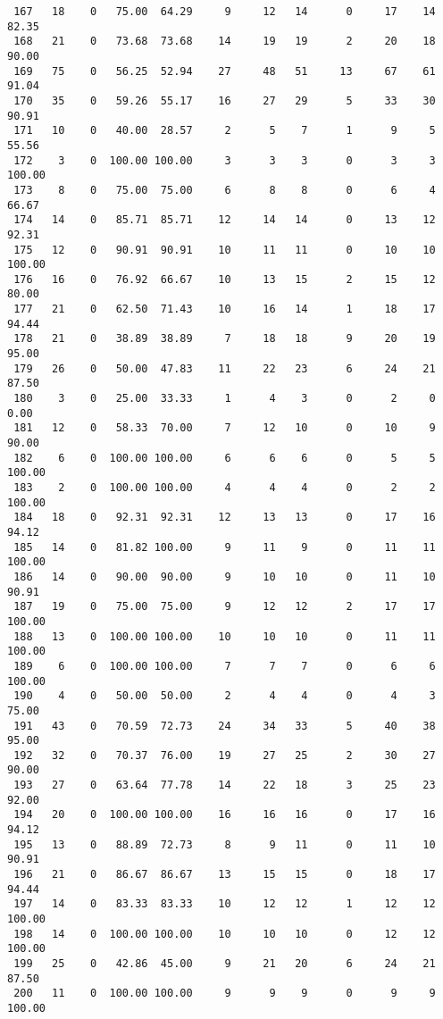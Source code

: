 \begin{verbatim}
 167   18    0   75.00  64.29     9     12   14      0     17    14    82.35
 168   21    0   73.68  73.68    14     19   19      2     20    18    90.00
 169   75    0   56.25  52.94    27     48   51     13     67    61    91.04
 170   35    0   59.26  55.17    16     27   29      5     33    30    90.91
 171   10    0   40.00  28.57     2      5    7      1      9     5    55.56
 172    3    0  100.00 100.00     3      3    3      0      3     3   100.00
 173    8    0   75.00  75.00     6      8    8      0      6     4    66.67
 174   14    0   85.71  85.71    12     14   14      0     13    12    92.31
 175   12    0   90.91  90.91    10     11   11      0     10    10   100.00
 176   16    0   76.92  66.67    10     13   15      2     15    12    80.00
 177   21    0   62.50  71.43    10     16   14      1     18    17    94.44
 178   21    0   38.89  38.89     7     18   18      9     20    19    95.00
 179   26    0   50.00  47.83    11     22   23      6     24    21    87.50
 180    3    0   25.00  33.33     1      4    3      0      2     0     0.00
 181   12    0   58.33  70.00     7     12   10      0     10     9    90.00
 182    6    0  100.00 100.00     6      6    6      0      5     5   100.00
 183    2    0  100.00 100.00     4      4    4      0      2     2   100.00
 184   18    0   92.31  92.31    12     13   13      0     17    16    94.12
 185   14    0   81.82 100.00     9     11    9      0     11    11   100.00
 186   14    0   90.00  90.00     9     10   10      0     11    10    90.91
 187   19    0   75.00  75.00     9     12   12      2     17    17   100.00
 188   13    0  100.00 100.00    10     10   10      0     11    11   100.00
 189    6    0  100.00 100.00     7      7    7      0      6     6   100.00
 190    4    0   50.00  50.00     2      4    4      0      4     3    75.00
 191   43    0   70.59  72.73    24     34   33      5     40    38    95.00
 192   32    0   70.37  76.00    19     27   25      2     30    27    90.00
 193   27    0   63.64  77.78    14     22   18      3     25    23    92.00
 194   20    0  100.00 100.00    16     16   16      0     17    16    94.12
 195   13    0   88.89  72.73     8      9   11      0     11    10    90.91
 196   21    0   86.67  86.67    13     15   15      0     18    17    94.44
 197   14    0   83.33  83.33    10     12   12      1     12    12   100.00
 198   14    0  100.00 100.00    10     10   10      0     12    12   100.00
 199   25    0   42.86  45.00     9     21   20      6     24    21    87.50
 200   11    0  100.00 100.00     9      9    9      0      9     9   100.00

\end{verbatim}
